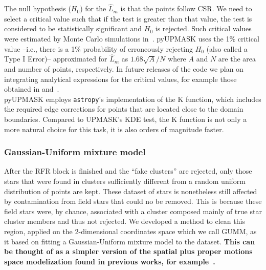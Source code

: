 \documentclass{aa}
\begin{document}
 The null hypothesis ($H_0$) for the $\hat{L}_{m}$ is that the points follow
 CSR. We need to select a critical value such that if the test is
 greater than that value, the test is considered to be statistically
 significant and $H_0$ is rejected.
 Such critical values were estimated by Monte Carlo simulations
 in~\cite{ripley_1979}. pyUPMASK uses the 1\% critical value --i.e.,
 there is a 1\% probability of erroneously rejecting $H_0$ (also called a
 Type I Error)-- approximated for $\hat{L}_{m}$ as $1.68\sqrt{A}/N$ where
 $A$ and $N$ are the area and number of points, respectively.
 In future releases of the code we plan on integrating analytical
 expressions for the critical values, for example those obtained in
 \cite{Lagache_2013} and~\cite{Marcon_2013}.\\

 pyUPMASK employs \texttt{astropy}'s implementation of the K function, which
 includes the required edge corrections for points that are located close to
 the domain boundaries. Compared to UPMASK's KDE test, the K function is not
 only a more natural choice for this task, it is also orders of magnitude
 faster.



\subsubsection{Gaussian-Uniform mixture model}
 \label{sssec:gumm}

 After the RFR block is finished and the ``fake clusters'' are rejected, only
 those stars that were found in clusters sufficiently different from a random
 uniform distribution of points are kept. These dataset of stars is
 nonetheless still affected by contamination from field stars that could no be
 removed. This is because these field stars were, by chance, associated with a
 cluster composed mainly of true star cluster members and thus not rejected.
 We developed a method to clean this region, applied on the 2-dimensional
 coordinates space which we call GUMM, as it based on fitting a
 Gaussian-Uniform mixture model to the dataset.
 \textbf{This can be thought of as a simpler version of the spatial plus
 proper motions space modelization found in previous works, for
 example~\citet{Jones_1988}.}
\end{document}
